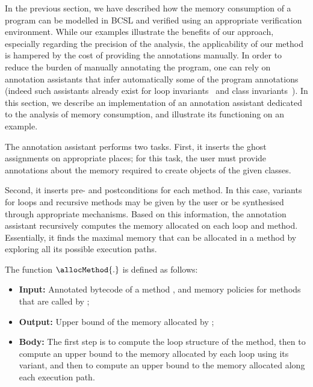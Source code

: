 In the previous section, we have described how the memory consumption
of a program can be modelled in BCSL and verified using an appropriate
verification environment. While our examples illustrate the benefits
of our approach, especially regarding the precision of the analysis,
the applicability of our method is hampered by the cost of providing
the annotations manually. In order to reduce the burden of manually
annotating the program, one can rely on annotation assistants that
infer automatically some of the program annotations (indeed such
assistants already exist for loop invariants~\cite{NimmerE02:ISSTA} and class
invariants~\cite{log04:vmcai}). In this section, we describe an
implementation of an annotation assistant dedicated to the analysis of
memory consumption, and illustrate its functioning on an example.
 
The annotation assistant performs two tasks. First, it inserts the
ghost assignments on appropriate places; for this task, the user must
provide annotations about the memory required to create objects of the
given classes. 

Second, it inserts pre- and postconditions for each method. In this case, variants for loops and recursive methods may be given by the user or be
synthesised through appropriate mechanisms.  Based on this
information, the annotation assistant recursively computes the memory
allocated on each loop and method. Essentially, it finds the maximal
memory that can be allocated in a method by exploring all its possible
execution paths.

The function $\allocMethod{.}$ is defined as follows:
\begin{itemize}
\item \textbf{Input:} Annotated bytecode of a method \method, and memory
policies for methods that are called by \method;

\item \textbf{Output:} Upper bound of the memory allocated by \method;

\item \textbf{Body:} The first step is to compute the loop structure
of the method, then to compute an upper bound to the memory allocated
by each loop using its variant, and then to compute an upper bound to
the memory allocated along each execution path.
\end{itemize}




